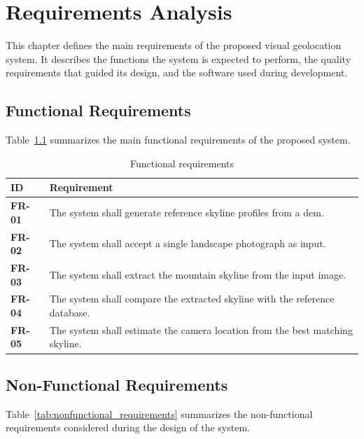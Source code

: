 \chapter{Requirements Analysis}
\label{chap:requirements}

This chapter defines the main requirements of the proposed visual geolocation system. It describes the functions the system is expected to perform, the quality requirements that guided its design, and the software used during development.

\section{Functional Requirements}

Table~\ref{tab:functional_requirements} summarizes the main functional requirements of the proposed system.

\begin{table}[H]
\centering
\caption{Functional requirements}
\label{tab:functional_requirements}
\begin{tabularx}{\textwidth}{>{\bfseries}l X}
\toprule
ID & Requirement \\
\midrule
FR-01 & The system shall generate reference skyline profiles from a \Gls{dem}. \\
FR-02 & The system shall accept a single landscape photograph as input. \\
FR-03 & The system shall extract the mountain skyline from the input image. \\
FR-04 & The system shall compare the extracted skyline with the reference database. \\
FR-05 & The system shall estimate the camera location from the best matching skyline. \\
\bottomrule
\end{tabularx}
\end{table}

\section{Non-Functional Requirements}

Table~\ref{tab:nonfunctional_requirements} summarizes the non-functional requirements considered during the design of the system.

